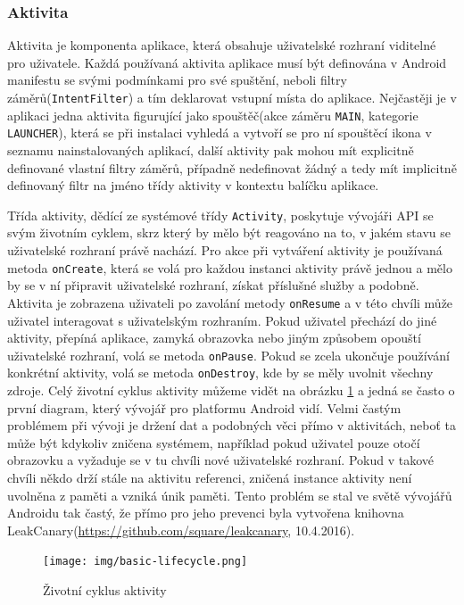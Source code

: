 \documentclass[czech,master,public,dept460,male,java,cpdeclaration]{diploma}
\begin{document}
\subsubsection{Aktivita}
Aktivita je komponenta aplikace, která obsahuje uživatelské rozhraní viditelné pro uživatele. Každá
 používaná aktivita aplikace musí být definována v Android manifestu se svými podmínkami pro své
 spuštění, neboli filtry záměrů(\texttt{IntentFilter}) a tím deklarovat vstupní místa do aplikace.
 Nejčastěji je v aplikaci jedna aktivita figurující jako spouštěč(akce záměru \texttt{MAIN},
 kategorie \texttt{LAUNCHER}), která se při
  instalaci vyhledá a vytvoří se pro ní spouštěcí ikona v seznamu nainstalovaných aplikací, další
  aktivity pak mohou mít explicitně definované vlastní filtry záměrů, případně nedefinovat žádný
  a tedy mít implicitně definovaný filtr na jméno třídy aktivity v kontextu balíčku aplikace.

 Třída aktivity, dědící ze systémové třídy \texttt{Activity},
 poskytuje vývojáři API se svým životním cyklem, skrz který by mělo být reagováno na to, v jakém
stavu se uživatelské rozhraní právě nachází. Pro akce při vytváření aktivity je používaná metoda
\texttt{onCreate}, která se volá pro každou instanci aktivity právě jednou a mělo by se v ní připravit
uživatelské rozhraní, získat příslušné služby a podobně. Aktivita je zobrazena uživateli po zavolání metody
\texttt{onResume} a v této chvíli může uživatel interagovat s uživatelským rozhraním. Pokud uživatel
přechází do jiné aktivity, přepíná aplikace, zamyká obrazovka nebo jiným způsobem opouští uživatelské
rozhraní, volá se metoda \texttt{onPause}. Pokud se zcela ukončuje používání konkrétní aktivity,
volá se metoda \texttt{onDestroy}, kde by se měly uvolnit všechny zdroje.
Celý životní cyklus aktivity můžeme vidět na obrázku \ref{fig:activitylyfecycle} a jedná se
často o první diagram, který vývojář pro platformu Android vidí.
Velmi častým problémem při vývoji je držení dat a podobných věci přímo v aktivitách,
neboť ta může být kdykoliv zničena systémem, například
pokud uživatel pouze otočí obrazovku a vyžaduje se v tu chvíli nové uživatelské rozhraní. Pokud v takové chvíli
někdo drží stále na aktivitu referenci, zničená instance aktivity není uvolněna z paměti a vzniká únik paměti.
Tento problém se stal ve světě vývojářů Androidu tak častý, že přímo pro jeho prevenci byla vytvořena knihovna
LeakCanary(\url{https://github.com/square/leakcanary}, 10.4.2016).
\begin{figure}[H]
        \centering
                \texttt{[image: img/basic-lifecycle.png]}
        \caption{Životní cyklus aktivity}
        \label{fig:activitylyfecycle}
\end{figure}
\end{document}

